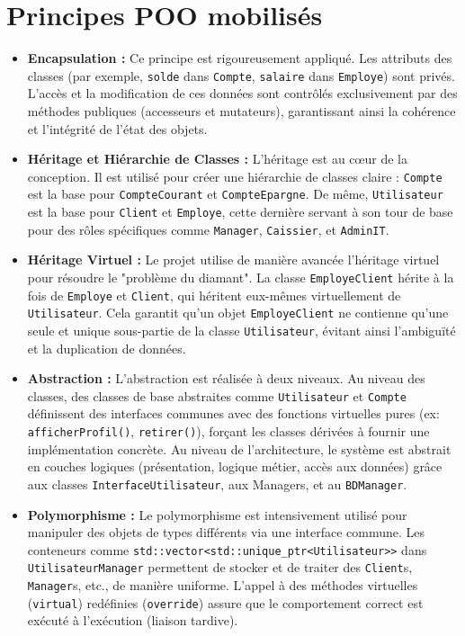 
\section{Principes POO mobilisés}
\begin{itemize}[leftmargin=*]
  \item \textbf{Encapsulation :} Ce principe est rigoureusement appliqué. Les attributs des classes (par exemple, \texttt{solde} dans \texttt{Compte}, \texttt{salaire} dans \texttt{Employe}) sont privés. L'accès et la modification de ces données sont contrôlés exclusivement par des méthodes publiques (accesseurs et mutateurs), garantissant ainsi la cohérence et l'intégrité de l'état des objets. 

  \item \textbf{Héritage et Hiérarchie de Classes :} L'héritage est au cœur de la conception. Il est utilisé pour créer une hiérarchie de classes claire : \texttt{Compte} est la base pour \texttt{CompteCourant} et \texttt{CompteEpargne}. De même, \texttt{Utilisateur} est la base pour \texttt{Client} et \texttt{Employe}, cette dernière servant à son tour de base pour des rôles spécifiques comme \texttt{Manager}, \texttt{Caissier}, et \texttt{AdminIT}. 

  \item \textbf{Héritage Virtuel :} Le projet utilise de manière avancée l'héritage virtuel pour résoudre le "problème du diamant". La classe \texttt{EmployeClient} hérite à la fois de \texttt{Employe} et \texttt{Client}, qui héritent eux-mêmes virtuellement de \texttt{Utilisateur}. Cela garantit qu'un objet \texttt{EmployeClient} ne contienne qu'une seule et unique sous-partie de la classe \texttt{Utilisateur}, évitant ainsi l'ambiguïté et la duplication de données. 

  \item \textbf{Abstraction :} L'abstraction est réalisée à deux niveaux. Au niveau des classes, des classes de base abstraites comme \texttt{Utilisateur} et \texttt{Compte} définissent des interfaces communes avec des fonctions virtuelles pures (ex: \texttt{afficherProfil()}, \texttt{retirer()}), forçant les classes dérivées à fournir une implémentation concrète. Au niveau de l'architecture, le système est abstrait en couches logiques (présentation, logique métier, accès aux données) grâce aux classes \texttt{InterfaceUtilisateur}, aux Managers, et au \texttt{BDManager}. 

  \item \textbf{Polymorphisme :} Le polymorphisme est intensivement utilisé pour manipuler des objets de types différents via une interface commune. Les conteneurs comme \texttt{std::vector<std::unique\_ptr<Utilisateur>>} dans \texttt{UtilisateurManager} permettent de stocker et de traiter des \texttt{Client}s, \texttt{Manager}s, etc., de manière uniforme. L'appel à des méthodes virtuelles (\texttt{virtual}) redéfinies (\texttt{override}) assure que le comportement correct est exécuté à l'exécution (liaison tardive). 


\end{itemize}
